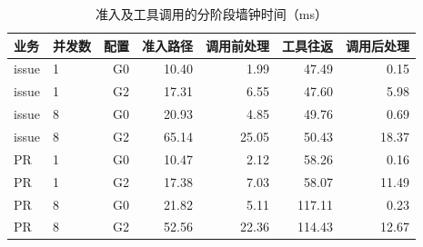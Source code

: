 \begin{table}[!htb]
\centering
\caption{准入及工具调用的分阶段墙钟时间（ms）}
\label{tab:overhead-stages-rr022}
\small
\begin{tabular}{llrrrrr}
\toprule
业务 & 并发数 & 配置 & 准入路径 & 调用前处理 & 工具往返 & 调用后处理 \\
\midrule
issue & 1 & G0 & 10.40 & 1.99 & 47.49 & 0.15 \\
issue & 1 & G2 & 17.31 & 6.55 & 47.60 & 5.98 \\
issue & 8 & G0 & 20.93 & 4.85 & 49.76 & 0.69 \\
issue & 8 & G2 & 65.14 & 25.05 & 50.43 & 18.37 \\
PR & 1 & G0 & 10.47 & 2.12 & 58.26 & 0.16 \\
PR & 1 & G2 & 17.38 & 7.03 & 58.07 & 11.49 \\
PR & 8 & G0 & 21.82 & 5.11 & 117.11 & 0.23 \\
PR & 8 & G2 & 52.56 & 22.36 & 114.43 & 12.67 \\
\bottomrule
\end{tabular}
\end{table}
